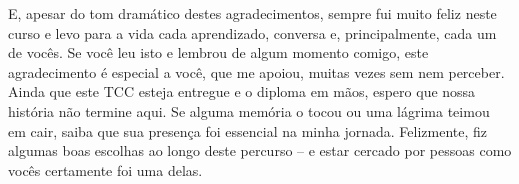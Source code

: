 \begin{agradecimentos}
    E, apesar do tom dramático destes agradecimentos, sempre fui muito feliz neste curso e levo para a vida cada aprendizado, conversa e, principalmente, cada um de vocês. Se você leu isto e lembrou de algum momento comigo, este agradecimento é especial a você, que me apoiou, muitas vezes sem nem perceber. Ainda que este TCC esteja entregue e o diploma em mãos, espero que nossa história não termine aqui. Se alguma memória o tocou ou uma lágrima teimou em cair, saiba que sua presença foi essencial na minha jornada. Felizmente, fiz algumas boas escolhas ao longo deste percurso – e estar cercado por pessoas como vocês certamente foi uma delas.


\end{agradecimentos}
